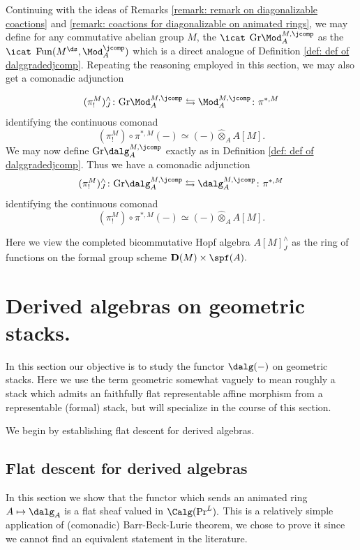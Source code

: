 \documentclass[10pt,reqno]{amsart}
\numberwithin{equation}{section}
\newcommand{\Gr}{\mathrm{Gr}}
\begin{document}
\begin{remark}\label{remark: continuous coaction diagonalizable schemes}
    Continuing with the ideas of Remarks \ref{remark: remark on diagonalizable coactions} and \ref{remark: coactions for diagonalizable on animated rings}, we  may define for any commutative abelian group $M$, the $\icat$ $\Gr\Mod_A^{M,\jcomp}$ as the $\icat$ $\mathrm{Fun}(M^\ds, \Mod_A^\jcomp)$ which is a direct analogue of Definition \ref{def: def of dalggradedjcomp}. 
    Repeating the reasoning employed in this section, we may also get a comonadic adjunction

    $$(\pi_!^M)^\wedge_{J}\colon \Gr\Mod_A^{M,\jcomp}\leftrightarrows \Mod_A^{M,\jcomp}\colon \pi^{*,M}$$ identifying the continuous comonad $$(\pi_!^M)\circ \pi^{*,M}(-)\simeq (-)\widehat{\otimes}_A A[M].$$
We may now define $\Gr\dalg_A^{M,\jcomp}$ exactly as in Definition \ref{def: def of dalggradedjcomp}.
    Thus we have a comonadic adjunction 
    $$(\pi_!^M)^\wedge_{J}\colon \Gr\dalg_A^{M,\jcomp}\leftrightarrows \dalg_A^{M,\jcomp}\colon \pi^{*,M}$$ identifying the continuous comonad $$(\pi_!^M)\circ \pi^{*,M}(-)\simeq (-)\widehat{\otimes}_A A[M].$$

    Here we view the completed bicommutative Hopf algebra $A[M]^\wedge_J$ as the ring of functions on the formal group scheme $\mathbf{D}(M)\times \spf(A).$ 
\end{remark}

\section{Derived algebras on geometric stacks.}\label{sec: dalg on geomstacks}

In this section our objective is to study the functor $\dalg(-)$ on geometric stacks. Here we use the term geometric somewhat vaguely to mean roughly a stack which admits an faithfully flat representable affine morphism from a representable (formal) stack, but will specialize in the course of this section.

We begin by establishing flat descent for derived algebras.


\subsection{Flat descent for derived algebras}

In this section we show that the functor which sends an animated ring $A\mapsto \dalg_A$ is a flat sheaf valued in $\Calg(\Pr^L).$ This is a relatively simple application of (comonadic) Barr-Beck-Lurie theorem, we chose to prove it since we cannot find an equivalent statement in the literature.
\end{document}
